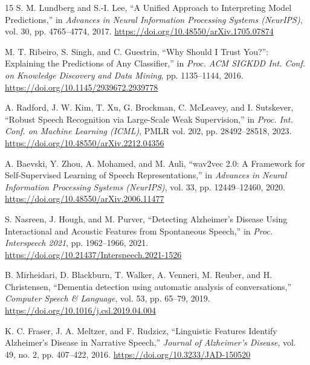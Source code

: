 \documentclass[conference]{IEEEtran}
\begin{document}
\begin{thebibliography}{15}
S. M. Lundberg and S.-I. Lee, ``A Unified Approach to Interpreting Model Predictions,'' in \emph{Advances in Neural Information Processing Systems (NeurIPS)}, vol. 30, pp. 4765--4774, 2017. \url{https://doi.org/10.48550/arXiv.1705.07874}

M. T. Ribeiro, S. Singh, and C. Guestrin, ``Why Should I Trust You?'': Explaining the Predictions of Any Classifier,'' in \emph{Proc. ACM SIGKDD Int. Conf. on Knowledge Discovery and Data Mining}, pp. 1135--1144, 2016. \url{https://doi.org/10.1145/2939672.2939778}

A. Radford, J. W. Kim, T. Xu, G. Brockman, C. McLeavey, and I. Sutskever, ``Robust Speech Recognition via Large-Scale Weak Supervision,'' in \emph{Proc. Int. Conf. on Machine Learning (ICML)}, PMLR vol. 202, pp. 28492--28518, 2023. \url{https://doi.org/10.48550/arXiv.2212.04356}

A. Baevski, Y. Zhou, A. Mohamed, and M. Auli, ``wav2vec 2.0: A Framework for Self-Supervised Learning of Speech Representations,'' in \emph{Advances in Neural Information Processing Systems (NeurIPS)}, vol. 33, pp. 12449--12460, 2020. \url{https://doi.org/10.48550/arXiv.2006.11477}

S. Nasreen, J. Hough, and M. Purver, ``Detecting Alzheimer's Disease Using Interactional and Acoustic Features from Spontaneous Speech,'' in \emph{Proc. Interspeech 2021}, pp. 1962--1966, 2021. \url{https://doi.org/10.21437/Interspeech.2021-1526}

B. Mirheidari, D. Blackburn, T. Walker, A. Venneri, M. Reuber, and H. Christensen, ``Dementia detection using automatic analysis of conversations,'' \emph{Computer Speech \& Language}, vol. 53, pp. 65--79, 2019. \url{https://doi.org/10.1016/j.csl.2019.04.004}

K. C. Fraser, J. A. Meltzer, and F. Rudzicz, ``Linguistic Features Identify Alzheimer's Disease in Narrative Speech,'' \emph{Journal of Alzheimer's Disease}, vol. 49, no. 2, pp. 407--422, 2016. \url{https://doi.org/10.3233/JAD-150520}

\end{thebibliography}
\end{document}
